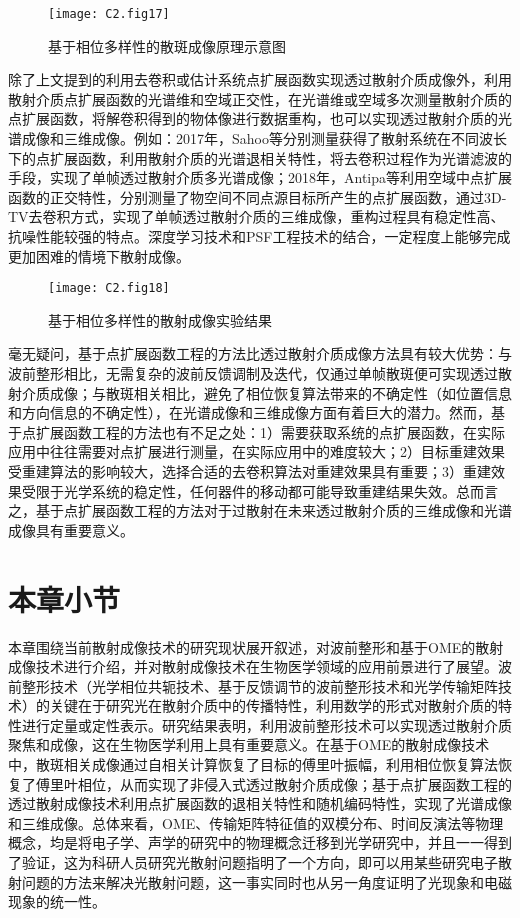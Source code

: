 \begin{figure}[htp]
	\centering
	\texttt{[image: C2.fig17]}
	\caption{基于相位多样性的散斑成像原理示意图}
	\label{fig2:17}
\end{figure}

除了上文提到的利用去卷积或估计系统点扩展函数实现透过散射介质成像外，利用散射介质点扩展函数的光谱维和空域正交性，在光谱维或空域多次测量散射介质的点扩展函数，将解卷积得到的物体像进行数据重构，也可以实现透过散射介质的光谱成像和三维成像。例如：2017年，Sahoo等\cite{sahoo_single-shot_2017}分别测量获得了散射系统在不同波长下的点扩展函数，利用散射介质的光谱退相关特性，将去卷积过程作为光谱滤波的手段，实现了单帧透过散射介质多光谱成像；2018年，Antipa等\cite{antipa_diffusercam_2018}利用空域中点扩展函数的正交特性，分别测量了物空间不同点源目标所产生的点扩展函数，通过3D-TV去卷积方式，实现了单帧透过散射介质的三维成像，重构过程具有稳定性高、抗噪性能较强的特点。深度学习技术和PSF工程技术的结合\cite{yanny_deep_2022}，一定程度上能够完成更加困难的情境下散射成像。

\begin{figure}[htp]
	\centering
	\texttt{[image: C2.fig18]}
	\caption{基于相位多样性的散射成像实验结果}
	\label{fig2:18}
\end{figure}

毫无疑问，基于点扩展函数工程的方法比透过散射介质成像方法具有较大优势：与波前整形相比，无需复杂的波前反馈调制及迭代，仅通过单帧散斑便可实现透过散射介质成像；与散斑相关相比，避免了相位恢复算法带来的不确定性（如位置信息和方向信息的不确定性），在光谱成像和三维成像方面有着巨大的潜力。然而，基于点扩展函数工程的方法也有不足之处：1）需要获取系统的点扩展函数，在实际应用中往往需要对点扩展进行测量，在实际应用中的难度较大；2）目标重建效果受重建算法的影响较大，选择合适的去卷积算法对重建效果具有重要；3）重建效果受限于光学系统的稳定性，任何器件的移动都可能导致重建结果失效。总而言之，基于点扩展函数工程的方法对于过散射在未来透过散射介质的三维成像和光谱成像具有重要意义。

\section{本章小节}

本章围绕当前散射成像技术的研究现状展开叙述，对波前整形和基于OME的散射成像技术进行介绍，并对散射成像技术在生物医学领域的应用前景进行了展望。波前整形技术（光学相位共轭技术、基于反馈调节的波前整形技术和光学传输矩阵技术）的关键在于研究光在散射介质中的传播特性，利用数学的形式对散射介质的特性进行定量或定性表示。研究结果表明，利用波前整形技术可以实现透过散射介质聚焦和成像，这在生物医学利用上具有重要意义。在基于OME的散射成像技术中，散斑相关成像通过自相关计算恢复了目标的傅里叶振幅，利用相位恢复算法恢复了傅里叶相位，从而实现了非侵入式透过散射介质成像；基于点扩展函数工程的透过散射成像技术利用点扩展函数的退相关特性和随机编码特性，实现了光谱成像和三维成像。总体来看，OME、传输矩阵特征值的双模分布、时间反演法等物理概念，均是将电子学、声学的研究中的物理概念迁移到光学研究中，并且一一得到了验证，这为科研人员研究光散射问题指明了一个方向，即可以用某些研究电子散射问题的方法来解决光散射问题，这一事实同时也从另一角度证明了光现象和电磁现象的统一性。

